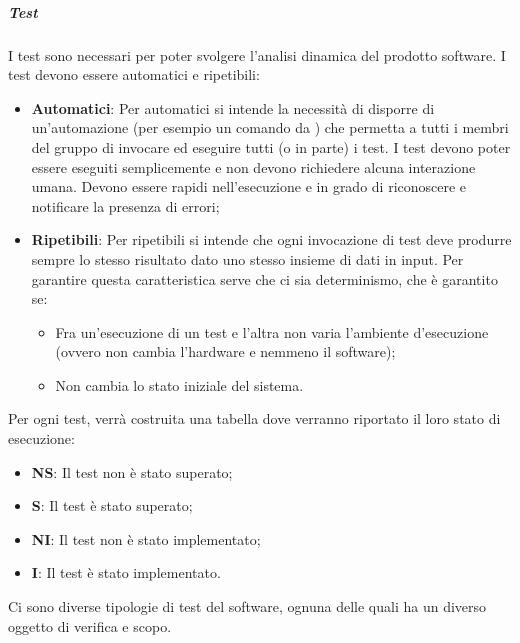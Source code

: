 \subparagraph*{Test} 
I test sono necessari per poter svolgere l'analisi dinamica del prodotto software.
I test devono essere automatici e ripetibili:
\begin{itemize}
\item \textbf{Automatici}: Per automatici si intende la necessità di disporre di un'automazione (per esempio un comando da ) che permetta a tutti i membri del gruppo di invocare ed eseguire tutti (o in parte) i test.
I test devono poter essere eseguiti semplicemente e non devono richiedere alcuna interazione umana.
Devono essere rapidi nell’esecuzione e in grado di riconoscere e notificare la presenza di errori;
\item \textbf{Ripetibili}: Per ripetibili si intende che ogni invocazione di test deve produrre sempre lo stesso risultato dato uno stesso insieme di dati in input.
Per garantire questa caratteristica serve che ci sia determinismo, che è garantito se:
\begin{itemize}
    \item Fra un'esecuzione di un test e l'altra non varia l'ambiente d'esecuzione (ovvero non cambia l'hardware e nemmeno il software);
    \item Non cambia lo stato iniziale del sistema.
\end{itemize}
\end{itemize}
Per ogni test, verrà costruita una tabella dove verranno riportato il loro stato di esecuzione:
\begin{itemize}
	\item \textbf{NS}: Il test non è stato superato;
	\item \textbf{S}: Il test è stato superato;
	\item \textbf{NI}: Il test non è stato implementato;
	\item \textbf{I}: Il test è stato implementato.
\end{itemize}

Ci sono diverse tipologie di test del software, ognuna delle quali ha un diverso oggetto di verifica e scopo.

